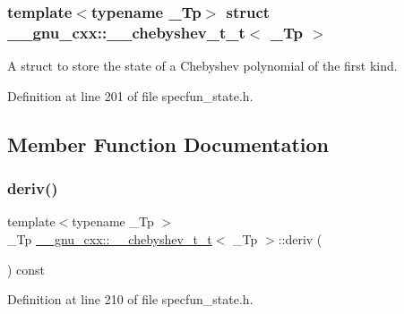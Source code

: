 \subsubsection*{template$<$typename \+\_\+\+Tp$>$\newline
struct \+\_\+\+\_\+gnu\+\_\+cxx\+::\+\_\+\+\_\+chebyshev\+\_\+t\+\_\+t$<$ \+\_\+\+Tp $>$}

A struct to store the state of a Chebyshev polynomial of the first kind. 

Definition at line 201 of file specfun\+\_\+state.\+h.



\subsection{Member Function Documentation}
\mbox{\label{struct____gnu__cxx_1_1____chebyshev__t__t_a56cbd3597ee48e612b596c9982d23e79}} 
\subsubsection{\texorpdfstring{deriv()}{deriv()}}
{\footnotesize\ttfamily template$<$typename \+\_\+\+Tp $>$ \\
\+\_\+\+Tp \hyperlink{struct____gnu__cxx_1_1____chebyshev__t__t}{\+\_\+\+\_\+gnu\+\_\+cxx\+::\+\_\+\+\_\+chebyshev\+\_\+t\+\_\+t}$<$ \+\_\+\+Tp $>$\+::deriv (\begin{DoxyParamCaption}{ }\end{DoxyParamCaption}) const\hspace{0.3cm}{\ttfamily [inline]}}



Definition at line 210 of file specfun\+\_\+state.\+h.

\mbox{\label{struct____gnu__cxx_1_1____chebyshev__t__t_a7b8086b8c304f7cca7cd971c7be8c2c5}} 
